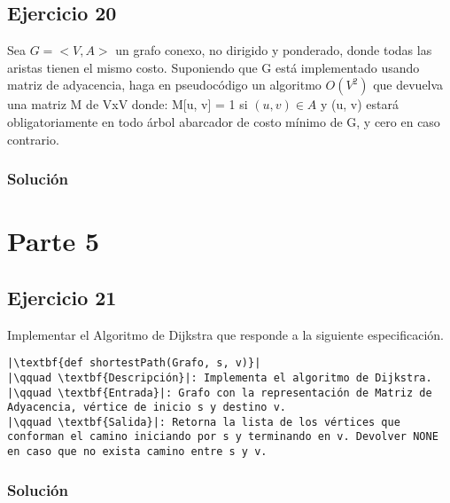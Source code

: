 \documentclass{article}
\begin{document}
\subsection*{Ejercicio 20}
Sea $G = <V, A>$ un grafo conexo, no dirigido y ponderado, donde todas las aristas tienen el mismo costo. Suponiendo que G está implementado usando matriz de adyacencia, haga en pseudocódigo un algoritmo $O(V^2)$ que devuelva una matriz M de VxV donde: M[u, v] = 1 si $(u,v) \in A$ y (u, v) estará obligatoriamente en todo árbol abarcador de costo mínimo de G, y cero en caso contrario.
\subsubsection*{Solución}


\section*{Parte 5}
\subsection*{Ejercicio 21}
Implementar el Algoritmo de Dijkstra que responde a la siguiente especificación.
\begin{lstlisting}
|\textbf{def shortestPath(Grafo, s, v)}|
|\qquad \textbf{Descripción}|: Implementa el algoritmo de Dijkstra.
|\qquad \textbf{Entrada}|: Grafo con la representación de Matriz de Adyacencia, vértice de inicio s y destino v.
|\qquad \textbf{Salida}|: Retorna la lista de los vértices que conforman el camino iniciando por s y terminando en v. Devolver NONE en caso que no exista camino entre s y v.
\end{lstlisting}
\subsubsection*{Solución}
\end{document}
